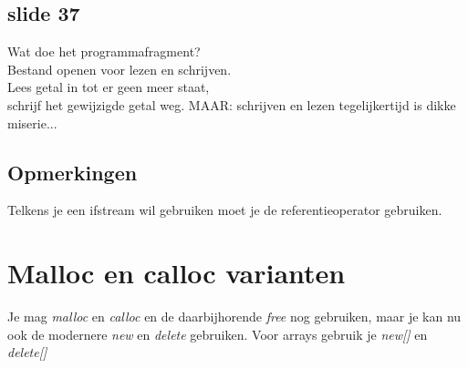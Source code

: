 \documentclass{article}
\begin{document}
\subsection{slide 37}
Wat doe het programmafragment?\\
Bestand openen voor lezen en schrijven. \\
Lees getal in tot er geen meer staat, \\
schrijf het gewijzigde getal weg. MAAR: schrijven en lezen tegelijkertijd is
dikke miserie...

\subsection{Opmerkingen}
Telkens je een ifstream wil gebruiken moet je de referentieoperator gebruiken.

\section{Malloc en calloc varianten}
Je mag \textit{malloc} en \textit{calloc} en de daarbijhorende \textit{free}
nog gebruiken, maar je kan nu ook de modernere \textit{new} en \textit{delete}
gebruiken. Voor arrays gebruik je \textit{new[]} en \textit{delete[]}
\end{document}
